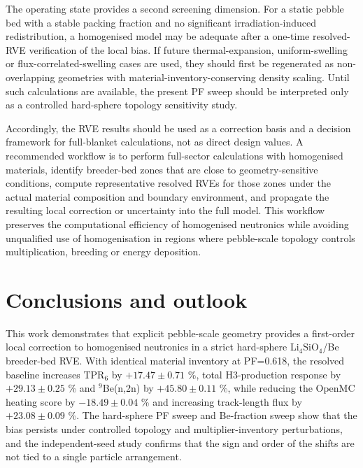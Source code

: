\documentclass[preprint,12pt]{elsarticle}
\begin{document}
The operating state provides a second screening dimension.  For a static pebble bed
with a stable packing fraction and no significant irradiation-induced
redistribution, a homogenised model may be adequate after a one-time
resolved-RVE verification of the local bias.  If future thermal-expansion,
uniform-swelling or flux-correlated-swelling cases are used, they should first
be regenerated as non-overlapping geometries with material-inventory-conserving
density scaling.  Until such calculations are available, the present PF sweep
should be interpreted only as a controlled hard-sphere topology sensitivity
study.

Accordingly, the RVE results should be used as a correction basis and a
decision framework for full-blanket calculations, not as direct design values.
A recommended workflow is to perform full-sector calculations with homogenised
materials, identify breeder-bed zones that are close to geometry-sensitive
conditions, compute representative resolved RVEs for those zones under the
actual material composition and boundary environment, and propagate the
resulting local correction or uncertainty into the full model.  This workflow
preserves the computational efficiency of homogenised neutronics while avoiding
unqualified use of homogenisation in regions where pebble-scale topology
controls multiplication, breeding or energy deposition.

\section{Conclusions and outlook}

This work demonstrates that explicit pebble-scale geometry provides a
first-order local correction to homogenised neutronics in a strict hard-sphere
Li$_4$SiO$_4$/Be breeder-bed RVE.  With identical material inventory at PF=0.618,
the resolved baseline increases TPR$_6$ by $+17.47\pm0.71$ \%, total
H3-production response by $+29.13\pm0.25$ \% and $^9$Be(n,2n) by
$+45.80\pm0.11$ \%, while reducing the OpenMC heating score by
$-18.49\pm0.04$ \% and increasing track-length flux by $+23.08\pm0.09$ \%.
The hard-sphere PF sweep and Be-fraction sweep show that the bias persists
under controlled topology and multiplier-inventory perturbations, and the
independent-seed study confirms that the sign and order of the shifts are not
tied to a single particle arrangement.
\end{document}
